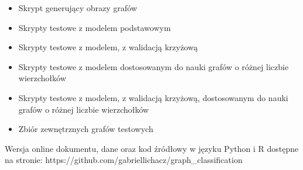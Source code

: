 
\begin{itemize}[label=-,labelsep=0.4cm,leftmargin=0.6cm]
    \item Skrypt generujący obrazy grafów
    \item Skrypty testowe z modelem podstawowym
    \item Skrypty testowe z modelem, z walidacją krzyżową
    \item Skrypty testowe z modelem dostosowanym do nauki grafów o różnej liczbie wierzchołków
    \item Skrypty testowe z modelem, z walidacją krzyżową, dostosowanym do nauki grafów o różnej liczbie wierzchołków
    \item Zbiór zewnętrznych grafów testowych
\end{itemize}

\vspace*{\fill}

Wersja online dokumentu, dane oraz kod źródłowy w języku Python i R dostępne na stronie:
https://github.com/gabriellichacz/graph\_classification